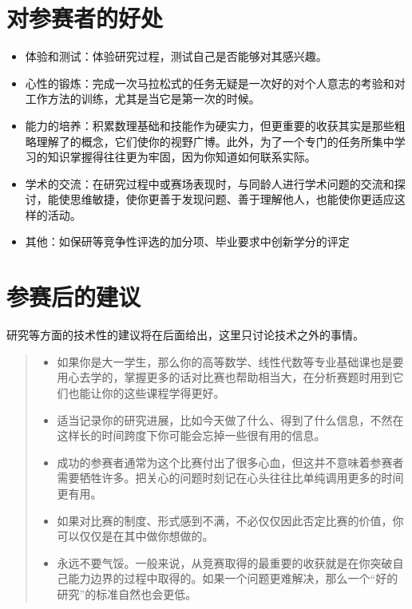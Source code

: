 \documentclass[a4paper,10pt,english]{sphinxmanual}
\begin{document}
\section{对参赛者的好处}
\label{\detokenize{2. Intro_Tournament:id9}}\begin{itemize}
\item {} 
体验和测试：体验研究过程，测试自己是否能够对其感兴趣。

\item {} 
心性的锻炼：完成一次马拉松式的任务无疑是一次好的对个人意志的考验和对工作方法的训练，尤其是当它是第一次的时候。

\item {} 
能力的培养：积累数理基础和技能作为硬实力，但更重要的收获其实是那些粗略理解了的概念，它们使你的视野广博。此外，为了一个专门的任务所集中学习的知识掌握得往往更为牢固，因为你知道如何联系实际。

\item {} 
学术的交流：在研究过程中或赛场表现时，与同龄人进行学术问题的交流和探讨，能使思维敏捷，使你更善于发现问题、善于理解他人，也能使你更适应这样的活动。

\item {} 
其他：如保研等竞争性评选的加分项、毕业要求中创新学分的评定

\end{itemize}


\section{参赛后的建议}
\label{\detokenize{2. Intro_Tournament:id10}}
研究等方面的技术性的建议将在后面给出，这里只讨论技术之外的事情。
\begin{quote}
\begin{itemize}
\item {} 
如果你是大一学生，那么你的高等数学、线性代数等专业基础课也是要用心去学的，掌握更多的话对比赛也帮助相当大，在分析赛题时用到它们也能让你的这些课程学得更好。

\item {} 
适当记录你的研究进展，比如今天做了什么、得到了什么信息，不然在这样长的时间跨度下你可能会忘掉一些很有用的信息。

\item {} 
成功的参赛者通常为这个比赛付出了很多心血，但这并不意味着参赛者需要牺牲许多。把关心的问题时刻记在心头往往比单纯调用更多的时间更有用。

\item {} 
如果对比赛的制度、形式感到不满，不必仅仅因此否定比赛的价值，你可以仅仅是在其中做你想做的。

\item {} 
永远不要气馁。一般来说，从竞赛取得的最重要的收获就是在你突破自己能力边界的过程中取得的。如果一个问题更难解决，那么一个“好的研究”的标准自然也会更低。

\end{itemize}

\end{quote}
\end{document}
